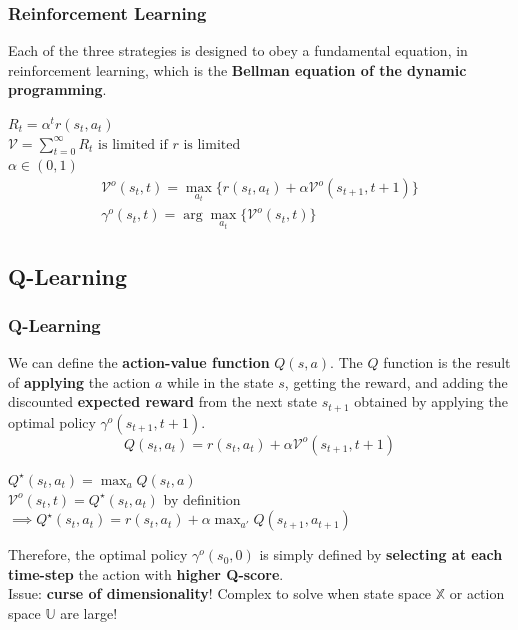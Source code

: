 \documentclass{beamer}
\begin{document}
\begin{frame}
\frametitle{Reinforcement Learning}
Each of the three strategies is designed to obey a fundamental equation, in reinforcement learning, which is the \textbf{Bellman equation of the dynamic programming}.
\begin{theorem} 
	$
	R_t =  \alpha^t r(s_t, a_t)$ 
	\\
	$\mathcal{V} = \sum_{t=0}^{\infty}R_t \text{ is limited if $r$ is limited}
	$
	\\
	$ \alpha \in (0,1) $
	\\
	\begin{equation}
	\begin{aligned}
	\mathcal{V}^o(s_t,t) = \max_{a_t}
	\bigg\{ r(s_t, a_t) + \alpha\mathcal{V}^o(s_{t+1}, t+1) \bigg\} \\
	\gamma^o(s_t, t) = \arg \max_{a_t} 		\big\{ \mathcal{V}^o(s_t,t)\big\}
	\end{aligned}
	\end{equation}

\end{theorem}

\end{frame}
\begin{frame}
\subsection{Q-Learning}
\frametitle{Q-Learning}
We can define the \textbf{action-value function} $Q(s,a) $. The $Q$ function is the result of \textbf{applying} the action $a$ while in the state $s$, getting the reward, and adding the discounted \textbf{expected reward} from the next state $s_{t+1}$ obtained by applying the optimal policy $\gamma^o(s_{t+1}, t+1)$.
\begin{equation}
	Q(s_t,a_t) = r(s_t, a_t) + \alpha \mathcal{V}^o(s_{t+1}, t+1)
\end{equation}
\begin{theorem}
	$Q^\star(s_t, a_t) = \max_{a} Q(s_t, a)$ \\
	$\mathcal{V}^o(s_t, t) = Q^\star(s_t, a_t)$ by definition \\
	$ \implies	Q^\star (s_t,a_t) = r(s_t, a_t) + \alpha \max_{a'} Q(s_{t+1}, a_{t+1})$
\end{theorem}
Therefore, the optimal policy $\gamma^o(s_0, 0)$ is simply defined by \textbf{selecting at each time-step} the action with \textbf{higher Q-score}. \\
Issue: \textbf{curse of dimensionality}! Complex to solve when state space $\mathbb{X}$ or action space $\mathbb{U}$ are large!
\end{frame}
\end{document}
